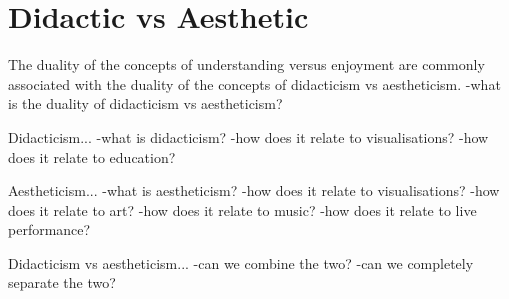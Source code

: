 \section{Didactic vs Aesthetic}

The duality of the concepts of understanding versus enjoyment are commonly associated with the duality of the concepts of didacticism vs aestheticism.
-what is the duality of didacticism vs aestheticism?

Didacticism...
-what is didacticism?
-how does it relate to visualisations?
-how does it relate to education?

Aestheticism...
-what is aestheticism?
-how does it relate to visualisations?
-how does it relate to art?
-how does it relate to music?
-how does it relate to live performance?

Didacticism vs aestheticism...
-can we combine the two?
-can we completely separate the two?










